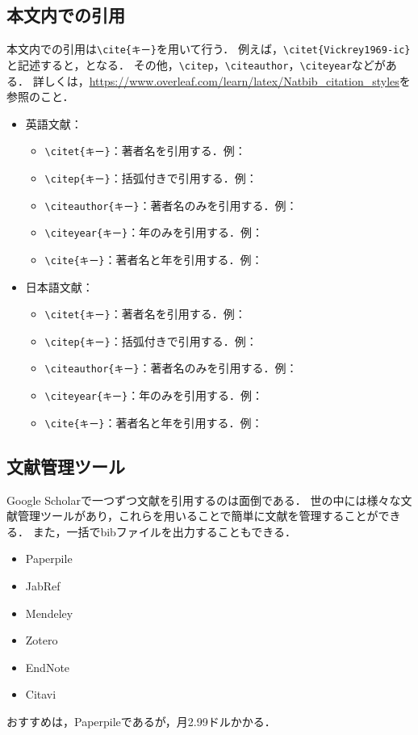 \documentclass[../main/main]{subfiles}
\begin{document}
\subsection{本文内での引用}
本文内での引用は\verb|\cite{キー}|を用いて行う．
例えば，\verb|\citet{Vickrey1969-ic}|と記述すると，\citet{Vickrey1969-ic}となる．
その他，\verb|\citep|，\verb|\citeauthor|，\verb|\citeyear|などがある．
詳しくは，\url{https://www.overleaf.com/learn/latex/Natbib\_citation\_styles}を参照のこと．
\par
\begin{itemize}
  \item 英語文献：
  \begin{itemize}
    \item \verb|\citet{キー}|：著者名を引用する．例：\citet{Vickrey1969-ic}
    \item \verb|\citep{キー}|：括弧付きで引用する．例：\citep{Vickrey1969-ic}
    \item \verb|\citeauthor{キー}|：著者名のみを引用する．例：\citeauthor{Vickrey1969-ic}
    \item \verb|\citeyear{キー}|：年のみを引用する．例：\citeyear{Vickrey1969-ic}
    \item \verb|\cite{キー}|：著者名と年を引用する．例：\cite{Vickrey1969-ic}
  \end{itemize}
  \item 日本語文献：
  \begin{itemize}
    \item \verb|\citet{キー}|：著者名を引用する．例：\citet{TAKAYAMA2014DEVELOPMENT}
    \item \verb|\citep{キー}|：括弧付きで引用する．例：\citep{TAKAYAMA2014DEVELOPMENT}
    \item \verb|\citeauthor{キー}|：著者名のみを引用する．例：\citeauthor{TAKAYAMA2014DEVELOPMENT}
    \item \verb|\citeyear{キー}|：年のみを引用する．例：\citeyear{TAKAYAMA2014DEVELOPMENT}
    \item \verb|\cite{キー}|：著者名と年を引用する．例：\cite{TAKAYAMA2014DEVELOPMENT}
  \end{itemize}
\end{itemize}




\subsection{文献管理ツール}
Google Scholarで一つずつ文献を引用するのは面倒である．
世の中には様々な文献管理ツールがあり，これらを用いることで簡単に文献を管理することができる．
また，一括でbibファイルを出力することもできる．
\begin{itemize}
  \item Paperpile
  \item JabRef
  \item Mendeley
  \item Zotero
  \item EndNote
  \item Citavi
\end{itemize}
おすすめは，Paperpileであるが，月2.99ドルかかる．
\end{document}
